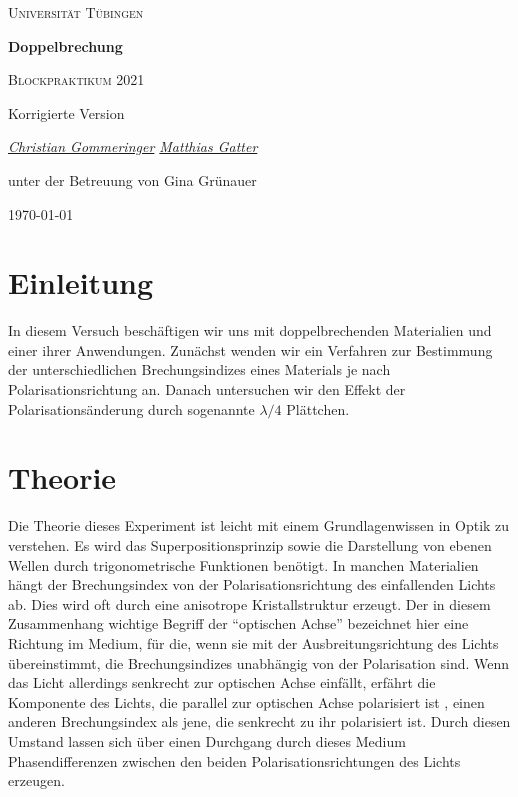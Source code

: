 \documentclass[a4paper, 12pt,]{scrartcl}
\begin{document}
\begin{titlepage}
	\centering
	{\scshape\LARGE Universität Tübingen \par}
	\vspace{2cm}
	{\huge\bfseries Doppelbrechung \par}
	\vspace{2cm}
	{\Large \scshape Blockpraktikum 2021} \par
	\vspace{2cm}
	{\Large  Korrigierte Version} \par
	\vspace{2cm}
	{\Large\itshape \underline{Christian Gommeringer} \space \space  \underline{Matthias Gatter}\par}
	\vfill 
	{\large unter der Betreuung von Gina Grünauer}
	\vfill

	{\large \today\par}
\end{titlepage}
\newpage 
\tableofcontents 

\newpage
\section{Einleitung}
\begin{flushleft}
In diesem Versuch beschäftigen wir uns mit doppelbrechenden Materialien und einer ihrer Anwendungen. Zunächst wenden wir ein Verfahren zur Bestimmung der unterschiedlichen Brechungsindizes eines Materials je nach Polarisationsrichtung an. Danach untersuchen wir den Effekt der Polarisationsänderung durch sogenannte $\lambda/4$ Plättchen.


\end{flushleft}

\section{Theorie}
Die Theorie dieses Experiment ist leicht mit einem Grundlagenwissen in Optik zu verstehen. Es wird das Superpositionsprinzip sowie die Darstellung von ebenen Wellen durch trigonometrische Funktionen benötigt. In manchen Materialien hängt der Brechungsindex von der Polarisationsrichtung des einfallenden Lichts ab. Dies wird oft durch eine anisotrope Kristallstruktur erzeugt. Der in diesem Zusammenhang wichtige Begriff der ``optischen Achse'' bezeichnet hier eine Richtung im Medium, für die, wenn sie mit der Ausbreitungsrichtung des Lichts übereinstimmt, die Brechungsindizes unabhängig von der Polarisation sind. Wenn das Licht allerdings senkrecht zur optischen Achse einfällt, erfährt die Komponente des Lichts, die parallel zur optischen Achse polarisiert ist , einen anderen Brechungsindex als jene, die senkrecht zu ihr polarisiert ist. Durch diesen Umstand lassen sich über einen Durchgang durch dieses Medium Phasendifferenzen zwischen den beiden Polarisationsrichtungen des Lichts erzeugen.\newline\newline
\end{document}
